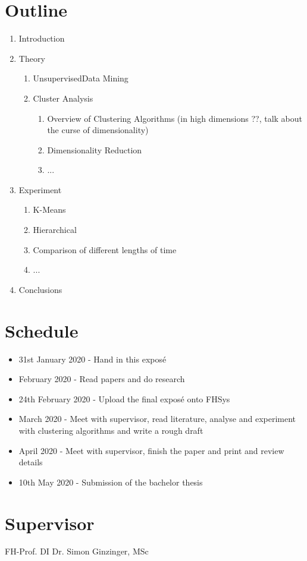 \documentclass[12pt,a4paper]{article}
\begin{document}
\section*{Outline}

\begin{enumerate}
	\item Introduction
	\item Theory
	\begin{enumerate}
		\item UnsupervisedData Mining 
		\item Cluster Analysis
		\begin{enumerate}
			\item Overview of Clustering Algorithms (in high dimensions ??, talk about the curse of dimensionality)
			\item Dimensionality Reduction
			\item ...
		\end{enumerate}
	\end{enumerate}
	\item Experiment
	\begin{enumerate}
		\item K-Means
		\item Hierarchical
		\item Comparison of different lengths of time
		\item ...
	\end{enumerate}
	\item Conclusions
\end{enumerate}

\nocite{*}
\printbibliography

\section*{Schedule}

\begin{itemize}
	\item 31st January 2020 - Hand in this exposé
	\item February 2020 - Read papers and do research
	\item 24th February 2020 - Upload the final exposé onto FHSys
	\item March 2020 - Meet with supervisor, read literature, analyse and experiment with clustering algorithms and write a rough draft
	\item April 2020 - Meet with supervisor, finish the paper and print and review details
	\item 10th May 2020 - Submission of the bachelor thesis
\end{itemize}

\section*{Supervisor}

FH-Prof. DI Dr. Simon Ginzinger, MSc
\end{document}
